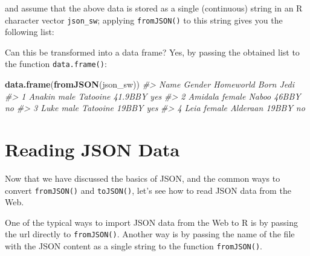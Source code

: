 \documentclass[
]{book}
\newenvironment{Shaded}{\begin{snugshade}}{\end{snugshade}}
\newcommand{\CommentTok}[1]{\textcolor[rgb]{0.56,0.35,0.01}{\textit{#1}}}
\newcommand{\FunctionTok}[1]{\textcolor[rgb]{0.13,0.29,0.53}{\textbf{#1}}}
\newcommand{\NormalTok}[1]{#1}
\begin{document}
and assume that the above data is stored as a single (continuous) string in
an R character vector \texttt{json\_sw}; applying \texttt{fromJSON()} to this string gives
you the following list:

\begin{Shaded}
\end{Shaded}

Can this be transformed into a data frame? Yes, by passing the obtained list
to the function \texttt{data.frame()}:

\begin{Shaded}
\begin{Highlighting}[]
\FunctionTok{data.frame}\NormalTok{(}\FunctionTok{fromJSON}\NormalTok{(json\_sw))}
\CommentTok{\#\textgreater{}      Name Gender Homeworld    Born Jedi}
\CommentTok{\#\textgreater{} 1  Anakin   male  Tatooine 41.9BBY  yes}
\CommentTok{\#\textgreater{} 2 Amidala female     Naboo   46BBY   no}
\CommentTok{\#\textgreater{} 3    Luke   male  Tatooine   19BBY  yes}
\CommentTok{\#\textgreater{} 4    Leia female  Alderaan   19BBY   no}
\end{Highlighting}
\end{Shaded}

\hypertarget{reading-json-data}{%
\section{Reading JSON Data}\label{reading-json-data}}

Now that we have discussed the basics of JSON, and the common ways to convert
\texttt{fromJSON()} and \texttt{toJSON()}, let's see how to read JSON data from the Web.

One of the typical ways to import JSON data from the Web to R is by passing
the url directly to \texttt{fromJSON()}. Another way is by passing the name of the
file with the JSON content as a single string to the function \texttt{fromJSON()}.
\end{document}

